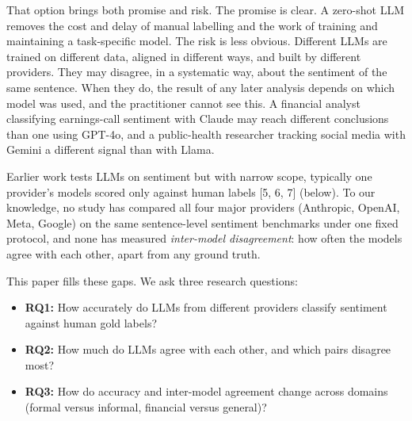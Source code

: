 \documentclass[11pt]{article}
\providecommand{\tightlist}{\setlength{\itemsep}{0pt}\setlength{\parskip}{0pt}}
\begin{document}
That option brings both promise and risk. The promise is clear. A
zero-shot LLM removes the cost and delay of manual labelling and the
work of training and maintaining a task-specific model. The risk is less
obvious. Different LLMs are trained on different data, aligned in
different ways, and built by different providers. They may disagree, in
a systematic way, about the sentiment of the same sentence. When they
do, the result of any later analysis depends on which model was used,
and the practitioner cannot see this. A financial analyst classifying
earnings-call sentiment with Claude may reach different conclusions than
one using GPT-4o, and a public-health researcher tracking social media
with Gemini a different signal than with Llama.

Earlier work tests LLMs on sentiment but with narrow scope, typically
one provider's models scored only against human labels {[}5, 6, 7{]}
(below). To our knowledge, no study has compared all four major
providers (Anthropic, OpenAI, Meta, Google) on the same sentence-level
sentiment benchmarks under one fixed protocol, and none has measured
\emph{inter-model disagreement}: how often the models agree with each
other, apart from any ground truth.

This paper fills these gaps. We ask three research questions:

\begin{itemize}
\tightlist
\item
  \textbf{RQ1:} How accurately do LLMs from different providers classify
  sentiment against human gold labels?
\item
  \textbf{RQ2:} How much do LLMs agree with each other, and which pairs
  disagree most?
\item
  \textbf{RQ3:} How do accuracy and inter-model agreement change across
  domains (formal versus informal, financial versus general)?
\end{itemize}
\end{document}
